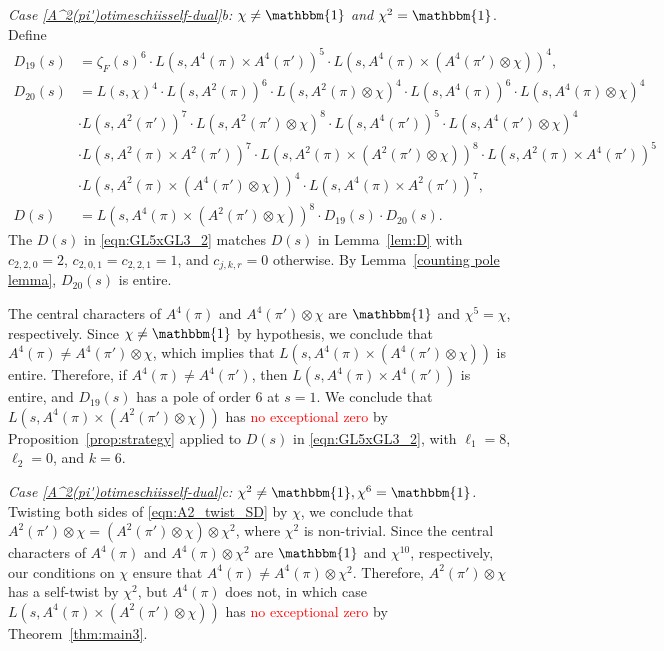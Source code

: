 \documentclass[11pt]{amsart}
\theoremstyle{remark}
\numberwithin{equation}{section}
\begin{document}
{\it Case \ref{A^2(pi')otimeschiisself-dual}b: $\chi\neq \mathbbm{1}$ and $\chi^2=\mathbbm{1}$}.  Define
\begin{equation}
\label{eqn:GL5xGL3_2}
\begin{aligned}
    D_{19}(s) &= \zeta_F(s)^6 \cdot L(s,A^4(\pi)\times A^4(\pi'))^5\cdot L(s,A^4(\pi)\times(A^4(\pi')\otimes\chi))^4,\\
    D_{20}(s) &= L(s,\chi)^4\cdot L(s,A^2(\pi))^6\cdot L(s,A^2(\pi)\otimes\chi)^4\cdot L(s,A^4(\pi))^6\cdot L(s,A^4(\pi)\otimes\chi)^4\\
    &\cdot L(s,A^2(\pi'))^7\cdot L(s,A^2(\pi')\otimes\chi)^8\cdot L(s,A^4(\pi'))^5\cdot L(s,A^4(\pi')\otimes\chi)^4\\
    &\cdot L(s,A^2(\pi)\times A^2(\pi'))^7\cdot L(s,A^2(\pi)\times(A^2(\pi')\otimes\chi))^8\cdot L(s,A^2(\pi)\times A^4(\pi'))^5\\
    &\cdot L(s,A^2(\pi)\times(A^4(\pi')\otimes\chi))^4\cdot L(s,A^4(\pi)\times A^2(\pi'))^7,\\
D(s)&=L(s,A^4(\pi)\times (A^2(\pi')\otimes\chi))^8\cdot D_{19}(s)\cdot D_{20}(s).
\end{aligned}
\end{equation}
The $D(s)$ in \eqref{eqn:GL5xGL3_2} matches $D(s)$ in Lemma~\ref{lem:D} with $c_{2,2,0} = 2$, $c_{2,0,1} =c_{2,2,1} = 1$, and $c_{j,k,r}=0$ otherwise.  By Lemma~\ref{counting pole lemma}, $D_{20}(s)$ is entire.

The central characters of $A^4(\pi)$ and $A^4(\pi')\otimes\chi$ are $\mathbbm{1}$ and $\chi^5=\chi$, respectively.  Since $\chi\neq\mathbbm{1}$ by hypothesis, we conclude that $A^4(\pi)\neq A^4(\pi')\otimes\chi$, which implies that $L(s,A^4(\pi)\times(A^4(\pi')\otimes\chi))$ is entire.  Therefore, if $A^4(\pi)\neq A^4(\pi')$, then $L(s,A^4(\pi)\times A^4(\pi'))$ is entire, and  $D_{19}(s)$ has a pole of order $6$ at $s=1$.  We conclude that $L(s,A^4(\pi) \times (A^2(\pi') \otimes \chi))$ has \textcolor{red}{no exceptional zero} by Proposition~\ref{prop:strategy} applied to $D(s)$ in \eqref{eqn:GL5xGL3_2}, with $\ell_1=8$, $\ell_2=0$, and $k=6$.

{\it Case \ref{A^2(pi')otimeschiisself-dual}c:  $\chi^2 \neq \mathbbm{1}, \chi^6 = \mathbbm{1}$.} 
Twisting both sides of \eqref{eqn:A2_twist_SD} by $\chi$, we conclude that $A^2(\pi') \otimes \chi  = (A^2(\pi') \otimes \chi) \otimes  \chi^2$, where $\chi^2$ is non-trivial.  Since the central characters of $A^4(\pi)$ and $A^4(\pi)\otimes\chi^2$ are $\mathbbm{1}$ and $\chi^{10}$, respectively, our conditions on $\chi$ ensure that $A^4(\pi)\neq A^4(\pi)\otimes\chi^2$.  Therefore, $A^2(\pi')\otimes\chi$ has a self-twist by $\chi^2$, but $A^4(\pi)$ does not, in which case $L(s,A^4(\pi)\times(A^2(\pi')\otimes\chi))$ has \textcolor{red}{no exceptional zero} by Theorem~\ref{thm:main3}.
\end{document}
